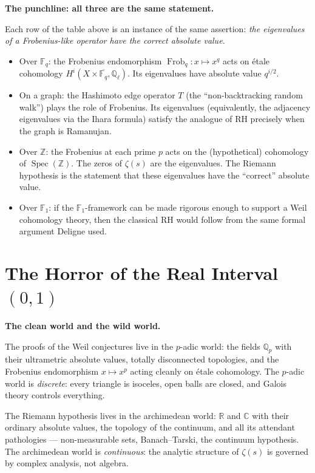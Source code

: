 \documentclass[11pt,a4paper]{article}
\theoremstyle{plain}
\theoremstyle{definition}
\newcommand{\R}{\mathbb{R}}
\newcommand{\Z}{\mathbb{Z}}
\newcommand{\C}{\mathbb{C}}
\newcommand{\Q}{\mathbb{Q}}
\newcommand{\F}{\mathbb{F}}
\newcommand{\Spec}{\operatorname{Spec}}
\newcommand{\Frob}{\operatorname{Frob}}
\begin{document}
\begin{tcolorbox}[breakable, colback=yellow!12, colframe=yellow!12,
  boxrule=0pt, sharp corners]
\textbf{The punchline: all three are the same statement.}

Each row of the table above is an instance of the same assertion:
\emph{the eigenvalues of a Frobenius-like operator have the correct
absolute value.}

\begin{itemize}
\item Over $\F_q$: the Frobenius endomorphism $\Frob_q : x \mapsto
  x^q$ acts on \'etale cohomology $H^i(X \times \overline{\F_q},
  \Q_\ell)$. Its eigenvalues have absolute value $q^{i/2}$.

\item On a graph: the Hashimoto edge operator $T$ (the
  ``non-backtracking random walk'') plays the role of Frobenius.
  Its eigenvalues (equivalently, the adjacency eigenvalues via the
  Ihara formula) satisfy the analogue of RH precisely when the
  graph is Ramanujan.

\item Over $\Z$: the Frobenius at each prime $p$ acts on the
  (hypothetical) cohomology of $\Spec(\Z)$. The zeros of $\zeta(s)$
  are the eigenvalues. The Riemann hypothesis is the statement that
  these eigenvalues have the ``correct'' absolute value.

\item Over $\F_1$: if the $\F_1$-framework can be made rigorous
  enough to support a Weil cohomology theory, then the classical RH
  would follow from the same formal argument Deligne used.
\end{itemize}
\end{tcolorbox}


\section{The Horror of the Real Interval $(0,1)$}
\label{sec:horror}

\begin{tcolorbox}[breakable, colback=yellow!12, colframe=yellow!12,
  boxrule=0pt, sharp corners]
\textbf{The clean world and the wild world.}

The proofs of the Weil conjectures live in the $p$-adic world: the
fields $\Q_p$ with their ultrametric absolute values, totally
disconnected topologies, and the Frobenius endomorphism $x \mapsto
x^p$ acting cleanly on \'etale cohomology. The $p$-adic world is
\emph{discrete}: every triangle is isoceles, open balls are closed,
and Galois theory controls everything.

The Riemann hypothesis lives in the archimedean world: $\R$ and $\C$
with their ordinary absolute values, the topology of the continuum,
and all its attendant pathologies --- non-measurable sets,
Banach--Tarski, the continuum hypothesis. The archimedean world is
\emph{continuous}: the analytic structure of $\zeta(s)$ is governed
by complex analysis, not algebra.
\end{tcolorbox}
\end{document}
